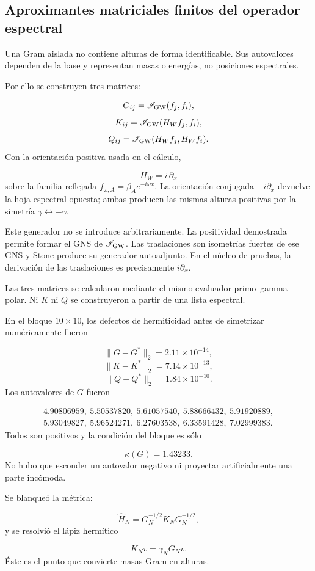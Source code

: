 \subsection{Aproximantes matriciales finitos del operador espectral}
Una Gram aislada no contiene alturas de forma identificable. Sus autovalores dependen de la base y representan masas o energías, no posiciones espectrales.\par
Por ello se construyen tres matrices:\par
\[
G_{ij}=\mathscr I_{\rm GW}(f_j,f_i),
\]
\[
K_{ij}=\mathscr I_{\rm GW}(H_Wf_j,f_i),
\]
\[
Q_{ij}=\mathscr I_{\rm GW}(H_Wf_j,H_Wf_i).
\]
Con la orientación positiva usada en el cálculo,\par
\[
H_W=i\,\partial_x
\]
sobre la familia reflejada \(f_{\omega,A}=\beta_Ae^{-i\omega x}\). La orientación conjugada \(-i\partial_x\) devuelve la hoja espectral opuesta; ambas producen las mismas alturas positivas por la simetría \(\gamma\leftrightarrow-\gamma\).\par
Este generador no se introduce arbitrariamente. La positividad demostrada permite formar el GNS de \(\mathscr I_{\rm GW}\). Las traslaciones son isometrías fuertes de ese GNS y Stone produce su generador autoadjunto. En el núcleo de pruebas, la derivación de las traslaciones es precisamente \(i\partial_x\).\par
Las tres matrices se calcularon mediante el mismo evaluador primo–gamma–polar. Ni \(K\) ni \(Q\) se construyeron a partir de una lista espectral.\par
En el bloque \(10\times10\), los defectos de hermiticidad antes de simetrizar numéricamente fueron\par
\[
\|G-G^*\|_2=2.11\times10^{-14},
\]
\[
\|K-K^*\|_2=7.14\times10^{-13},
\]
\[
\|Q-Q^*\|_2=1.84\times10^{-10}.
\]
Los autovalores de \(G\) fueron\par
\[
\begin{aligned}
4.90806959,\ 5.50537820,\ 5.61057540,\ 5.88666432,\ 5.91920889,\\
5.93049827,\ 5.96524271,\ 6.27603538,\ 6.33591428,\ 7.02999383.
\end{aligned}
\]
Todos son positivos y la condición del bloque es sólo\par
\[
\kappa(G)=1.43233.
\]
No hubo que esconder un autovalor negativo ni proyectar artificialmente una parte incómoda.\par
Se blanqueó la métrica:\par
\[
\widehat H_N
=
G_N^{-1/2}K_NG_N^{-1/2},
\]
y se resolvió el lápiz hermítico\par
\[
K_Nv=\gamma_NG_Nv.
\]
Éste es el punto que convierte masas Gram en alturas.\par
{}
